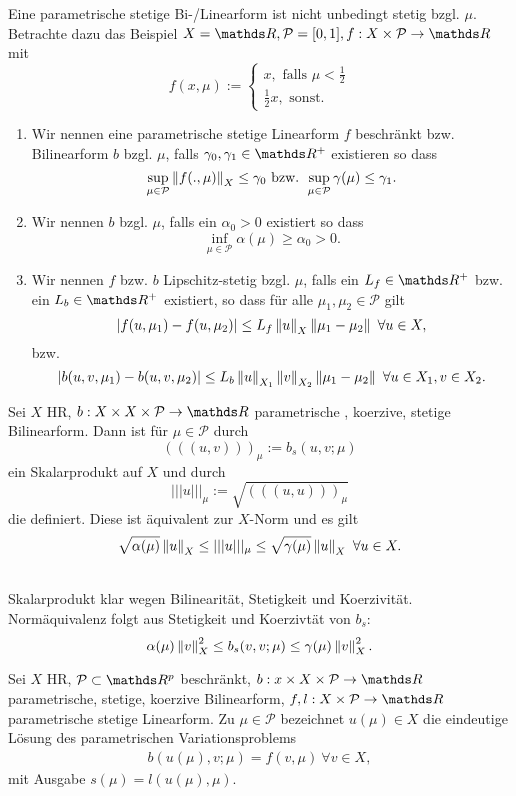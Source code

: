 Eine parametrische stetige Bi-/Linearform ist nicht unbedingt stetig bzgl. $\mu$.
Betrachte dazu das Beispiel $X=\R,\mathcal{P}=[0,1],f:X\times \mathcal{P}\to\R$ mit
\[
f(x,\mu):=\left\{\begin{array}{l}x,\text{ falls }\mu<\frac{1}{2}\\ \frac{1}{2}x,\text{ sonst.}  \end{array}\right.
\]

\begin{enumerate}[(1)]
	\item Wir nennen eine parametrische stetige Linearform $f$ beschränkt bzw. Bilinearform $b$  bzgl. $\mu$, falls $\gamma_0,\gamma_1\in\R^+$ existieren so dass
	\[
	\sup\limits_{\mu\in\mathcal{P}}\left\Vert f(.,\mu)\right\Vert_X\le \gamma_0 \text{ bzw. } \sup\limits_{\mu\in\mathcal{P}}\gamma(\mu)\le \gamma_1.
	\]
	\item Wir nennen $b$  bzgl. $\mu$, falls ein $\alpha_0>0$ existiert so dass
	\[
	\inf\limits_{\mu \in \mathcal{P}} \alpha(\mu)\ge \alpha_0>0.
	\]
	\item Wir nennen $f$ bzw. $b$ Lipschitz-stetig bzgl. $\mu$, falls ein $L_f\in \R^+$ bzw. ein $L_b\in \R^+$ existiert, so dass für alle $\mu_1,\mu_2\in\mathcal{P}$ gilt
	\[
	\left\vert f(u,\mu_1)-f(u,\mu_2)\right\vert\le L_f\left\Vert u\right\Vert_X\left\Vert\mu_1-\mu_2\right\Vert ~\forall  u\in X,
	\]
	bzw.
	\[
	\left\vert b(u,v,\mu_1)-b(u,v,\mu_2)\right\vert\le L_b\left\Vert u\right\Vert_{X_1}\left\Vert v\right\Vert_{X_2}\left\Vert\mu_1-\mu_2\right\Vert~\forall u\in X_1,v\in X_2.
	\]
\end{enumerate}

Sei $X$ HR, $b:X\times X\times \mathcal{P}\to \R$ parametrische , koerzive, stetige Bilinearform.
Dann ist für $\mu\in\mathcal{P}$ durch
\[
(((u,v)))_\mu := b_s(u,v;\mu)
\]
ein Skalarprodukt auf $X$ und durch
\[
|||u|||_\mu := \sqrt{(((u,u)))_\mu}
\]
die  definiert.
Diese ist äquivalent zur $X$-Norm und es gilt
\[
\sqrt{\alpha(\mu)}\left\Vert u\right\Vert_X \le |||u|||_\mu \le \sqrt{\gamma(\mu)}\left\Vert u\right\Vert_X ~\forall u\in X.
\]

\\
Skalarprodukt klar wegen Bilinearität, Stetigkeit und Koerzivität.
Normäquivalenz folgt aus Stetigkeit und Koerzivtät von $b_s$:
\[
\alpha(\mu)\left\Vert v\right\Vert_X^2\le b_s(v,v;\mu) \le \gamma(\mu) \left\Vert v\right\Vert_X^2.
\]

Sei $X$ HR, $\mathcal{P}\subset \R^p$ beschränkt, $b: x\times X\times \mathcal{P}\to \R$ parametrische, stetige, koerzive Bilinearform, $f,l:X\times \mathcal{P}\to \R$ parametrische stetige Linearform.
Zu $\mu \in\mathcal{P}$ bezeichnet $u(\mu)\in X$ die eindeutige Lösung des parametrischen Variationsproblems
\begin{align}
b(u(\mu),v;\mu) = f(v,\mu) ~\forall v\in X,
\end{align}
mit Ausgabe $s(\mu)=l(u(\mu),\mu)$.

